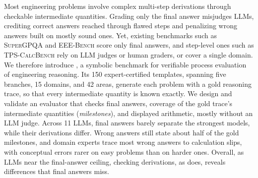 Most engineering problems involve complex multi-step derivations through checkable intermediate
quantities.
Grading only the final answer misjudges LLMs, crediting correct answers reached through flawed steps
and penalizing wrong answers built on mostly sound ones.
Yet, existing benchmarks such as \textsc{SuperGPQA} and \textsc{EEE-Bench} score only final answers,
and step-level ones such as \textsc{TPS-CalcBench} rely on LLM judges or human graders, or cover a
single domain.
We therefore introduce \ourdataset, a symbolic benchmark for verifiable process evaluation of
engineering reasoning.
Its 150 expert-certified templates, spanning five branches, 15 domains, and 42 areas, generate each
problem with a gold reasoning trace, so that every intermediate quantity is known exactly.
We design and validate an evaluator that checks final answers, coverage of the gold trace's
intermediate quantities (\emph{milestones}), and displayed arithmetic, mostly without an LLM judge.
Across 11 LLMs, final answers barely separate the strongest models, while their derivations differ.
Wrong answers still state about half of the gold milestones, and domain experts trace most wrong
answers to calculation slips, with conceptual errors rarer on easy problems than on harder ones.
Overall, as LLMs near the final-answer ceiling, checking derivations, as \ourdataset does, reveals
differences that final answers miss.
